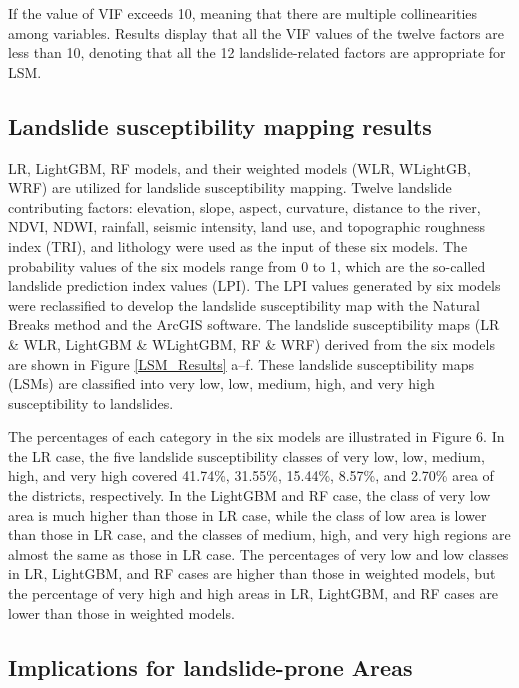 \documentclass[a4paper,fleqn]{cas-sc}
\begin{document}
If the value of VIF exceeds 10, meaning that there are multiple collinearities among variables. 
Results display that all the VIF values of the twelve factors are less than 10, denoting that all the 12 landslide-related factors are appropriate for LSM.

\subsection{Landslide susceptibility mapping results}

LR, LightGBM, RF models, and their weighted models (WLR, WLightGB, WRF) are utilized for landslide susceptibility mapping. 
Twelve landslide contributing factors: elevation, slope, aspect, curvature, distance to the river, NDVI, NDWI, rainfall, seismic intensity, land use, and topographic roughness index (TRI), and lithology were used as the input of these six models. 
The probability values of the six models range from 0 to 1, which are the so-called landslide prediction index values (LPI). 
The LPI values generated by six models were reclassified to develop the landslide susceptibility map with the Natural Breaks method and the ArcGIS software. 
The landslide susceptibility maps (LR \& WLR, LightGBM \& WLightGBM, RF \& WRF) derived from the six models are shown in Figure \ref{LSM_Results} a–f. 
These landslide susceptibility maps (LSMs) are classified into very low, low, medium, high, and very high susceptibility to landslides. 

The percentages of each category in the six models are illustrated in Figure 6. 
In the LR case, the five landslide susceptibility classes of very low, low, medium, high, and very high covered 41.74\%, 31.55\%, 15.44\%, 8.57\%, and 2.70\% area of the districts, respectively. 
In the LightGBM and RF case, the class of very low area is much higher than those in LR case, while the class of low area is lower than those in LR case, and the classes of medium, high, and very high regions are almost the same as those in LR case. 
The percentages of very low and low classes in LR, LightGBM, and RF cases are higher than those in weighted models, but the percentage of very high and high areas in LR, LightGBM, and RF cases are lower than those in weighted models.

\subsection{Implications for landslide-prone Areas}
\end{document}
